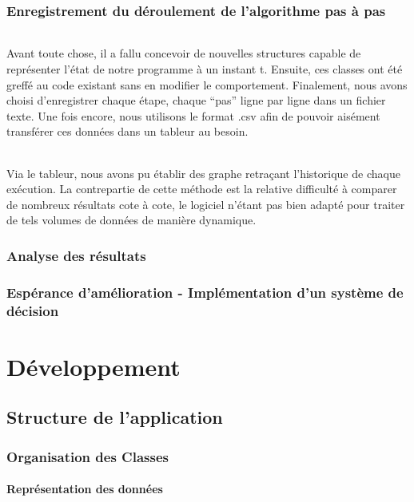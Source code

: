 \documentclass[a4paper,10pt]{report}
\begin{document}
\section{Enregistrement du déroulement de l'algorithme pas à pas}

\paragraph{}
  Avant toute chose, il a fallu concevoir de nouvelles structures capable de représenter l'état de notre programme
à un instant t. Ensuite, ces classes ont été greffé au code existant sans en modifier le comportement. Finalement,
nous avons choisi d'enregistrer chaque étape, chaque ``pas'' ligne par ligne dans un fichier texte. Une fois encore,
nous utilisons le format .csv afin de pouvoir aisément transférer ces données dans un tableur au besoin.

\paragraph{}
  Via le tableur, nous avons pu établir des graphe retraçant l'historique de chaque exécution. La contrepartie de
cette méthode est la relative difficulté à comparer de nombreux résultats cote à cote, le logiciel n'étant pas
bien adapté pour traiter de tels volumes de données de manière dynamique.

\section{Analyse des résultats}

\section{Espérance d'amélioration - Implémentation d'un système de décision}

\part{Développement}
\chapter{Structure de l'application}
\section{Organisation des Classes}
\subsection{Représentation des données}
\end{document}

